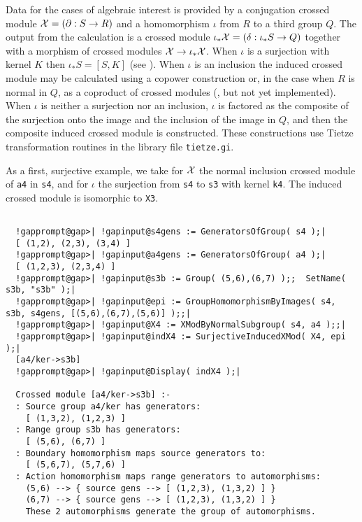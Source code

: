 \documentclass[a4paper,11pt]{report}
\begin{document}
{{{ Data for the cases of algebraic interest is provided by a conjugation crossed
module ${\cal X} = (\partial : S \to R)$ and a homomorphism $\iota$ from $R$ to a third group $Q$. The output from the calculation is a crossed module $\iota_{\ast}{\cal X} = (\delta : \iota_{\ast}S \to Q)$ together with a morphism of crossed modules ${\cal X} \to \iota_{\ast}{\cal X}$. When $\iota$ is a surjection with kernel $K$ then $\iota_{\ast}S = [S,K]$ (see \cite{BH1}). When $\iota$ is an inclusion the induced crossed module may be calculated using a copower
construction \cite{BW1} or, in the case when $R$ is normal in $Q$, as a coproduct of crossed modules (\cite{BW2}, but not yet implemented). When $\iota$ is neither a surjection nor an inclusion, $\iota$ is factored as the composite of the surjection onto the image and the
inclusion of the image in $Q$, and then the composite induced crossed module is constructed. These
constructions use Tietze transformation routines in the library file \texttt{tietze.gi}. 

 As a first, surjective example, we take for ${\cal X}$ the normal inclusion crossed module of \texttt{a4} in \texttt{s4}, and for $\iota$ the surjection from \texttt{s4} to \texttt{s3} with kernel \texttt{k4}. The induced crossed module is isomorphic to \texttt{X3}. }

 

 
\begin{Verbatim}[commandchars=!@|,fontsize=\small,frame=single,label=Example]
  
  !gapprompt@gap>| !gapinput@s4gens := GeneratorsOfGroup( s4 );|
  [ (1,2), (2,3), (3,4) ]
  !gapprompt@gap>| !gapinput@a4gens := GeneratorsOfGroup( a4 );|
  [ (1,2,3), (2,3,4) ]
  !gapprompt@gap>| !gapinput@s3b := Group( (5,6),(6,7) );;  SetName( s3b, "s3b" );|
  !gapprompt@gap>| !gapinput@epi := GroupHomomorphismByImages( s4, s3b, s4gens, [(5,6),(6,7),(5,6)] );;|
  !gapprompt@gap>| !gapinput@X4 := XModByNormalSubgroup( s4, a4 );;|
  !gapprompt@gap>| !gapinput@indX4 := SurjectiveInducedXMod( X4, epi );|
  [a4/ker->s3b]
  !gapprompt@gap>| !gapinput@Display( indX4 );|
  
  Crossed module [a4/ker->s3b] :- 
  : Source group a4/ker has generators:
    [ (1,3,2), (1,2,3) ]
  : Range group s3b has generators:
    [ (5,6), (6,7) ]
  : Boundary homomorphism maps source generators to:
    [ (5,6,7), (5,7,6) ]
  : Action homomorphism maps range generators to automorphisms:
    (5,6) --> { source gens --> [ (1,2,3), (1,3,2) ] }
    (6,7) --> { source gens --> [ (1,2,3), (1,3,2) ] }
    These 2 automorphisms generate the group of automorphisms.
  

\end{Verbatim}}}
\end{document}
